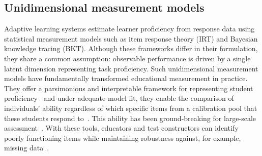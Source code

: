 \documentclass[12pt]{article}
\begin{document}
\subsection{Unidimensional measurement models}
Adaptive learning systems estimate learner proficiency from response data using statistical measurement models such as item response theory (IRT) and Bayesian knowledge tracing (BKT). Although these frameworks differ in their formulation, they share a common assumption: observable performance is driven by a single latent dimension representing task proficiency. Such unidimensional measurement models have fundamentally transformed educational measurement in practice. They offer a parsimonious and interpretable framework for representing student proficiency~\parencite{rasch1993probabilistic, hambleton1991fundamentals, embretson2013item, de2013theory} and under adequate model fit, they enable the comparison of individuals' ability regardless of which specific items from a calibration pool that these students respond to~\parencite{rasch1993probabilistic, wright1982rating}. This ability has been ground-breaking for large-scale assessment~\parencite{lord2012applications, van2010elements}. With these tools, educators and test constructors can identify poorly functioning items while maintaining robustness against, for example, missing data~\parencite{mislevy1996missing, de2013theory}.  

\end{document}
